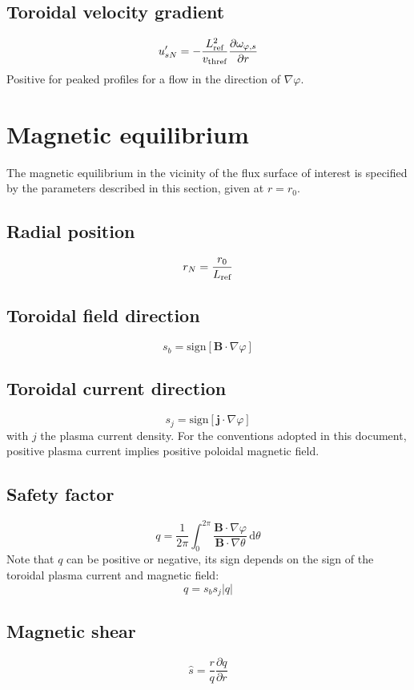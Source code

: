 \documentclass[fleqn]{report}
\begin{document}
\subsection{Toroidal velocity gradient}
$$u'_{sN}=-\frac{L_{\textrm{ref}}^2}{v_\textrm{thref}}\frac{\partial \omega_{\varphi,s}}{\partial r}$$
Positive for peaked profiles for a flow in the direction of $\nabla \varphi$.

\section{Magnetic equilibrium}
The magnetic equilibrium in the vicinity of the flux surface of interest is specified by the parameters described in this section, given at $r=r_0$.

\subsection{Radial position}
$$r_N=\frac{r_0}{L_{\textrm{ref}}}$$


\subsection{Toroidal field direction}
$$s_b = \textrm{sign}[\mathbf{B}\cdot\nabla\varphi]$$

\subsection{Toroidal current direction}
$$s_j = \textrm{sign}[\mathbf{j}\cdot\nabla\varphi]$$
with $j$ the plasma current density. For the conventions adopted in this document, positive plasma current implies positive poloidal magnetic field.

\subsection{Safety factor}
$$q=\frac{1}{2\pi}\int_0^{2\pi} \frac{\mathbf{B}\cdot\nabla \varphi}{\mathbf{B}\cdot\nabla \theta}\,\textrm{d}\theta$$
Note that $q$ can be positive or negative, its sign depends on the sign of the toroidal plasma current and magnetic field:
$$q = s_b s_j |q|$$

\subsection{Magnetic shear}
$$\hat{s}=\frac{r}{q}\frac{\partial q}{\partial r}$$
\end{document}
